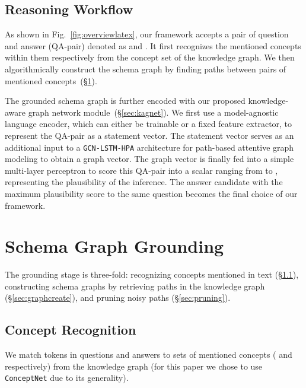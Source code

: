 \documentclass[11pt,a4paper]{article}
\newcommand{\secref}[1]{\S\ref{#1}}
\begin{document}
\subsection{Reasoning Workflow}
As shown in Fig.~\ref{fig:overviewlatex}, our framework accepts 
a pair of question and answer (QA-pair) denoted as  and .
It first recognizes  the mentioned concepts within them respectively from the concept set  of the knowledge graph.
We then algorithmically construct the schema graph  by finding paths between pairs of mentioned concepts~(\secref{sec:grounding}).


The grounded schema graph is further encoded with our proposed knowledge-aware graph network module~(\secref{sec:kagnet}).
We first use a model-agnostic language encoder, which can either be trainable or a fixed feature extractor, to represent the QA-pair as a statement vector.
The statement vector serves as an additional input to a \texttt{GCN-LSTM-HPA} architecture for path-based attentive graph modeling to obtain a graph vector. 
The graph vector is finally fed into a simple multi-layer perceptron to score this QA-pair into a scalar ranging from  to , representing the plausibility of the inference.
The answer candidate with the maximum plausibility score to the same question becomes the final choice of our framework.



\section{Schema Graph Grounding}
\label{sec:grounding}
The grounding stage is three-fold: recognizing concepts mentioned in text (\secref{sec:mcr}), constructing schema graphs by retrieving paths in the knowledge graph (\secref{sec:graphcreate}), and pruning noisy paths (\secref{sec:pruning}).


\subsection{Concept Recognition}
\label{sec:mcr}
We match tokens in questions and answers to sets of mentioned concepts ( and  respectively)  from the knowledge graph  (for this paper we chose to use \texttt{ConceptNet} due to its generality).
\end{document}
